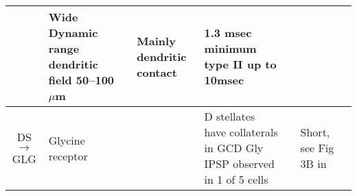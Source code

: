 \begin{longtable}{cXXXXXXX}
& %
Wide Dynamic range \citep{GhoshalKim:1997} 
dendritic field 50--100 $\mu$m \citep{FerragamoGoldingEtAl:1998a}                     
&                                            
& %
Mainly dendritic contact %
\citep{BensonBrown:2004}                
& %
1.3 msec minimum \citep{FerragamoGoldingEtAl:1998a} 
type II up to 10msec \citep[theoretical][]{Brown:1993}
\\ \midrule
DS\ensuremath{\rightarrow}GLG                                 
&                  
Glycine receptor                  
&  %
& 
& D stellates have collaterals in GCD \citep[mouse][]{OertelWuEtAl:1990}
Gly IPSP observed in 1 of 5 cells \citep{FerragamoGoldingEtAl:1998}    
&                                            
& %
Short, see Fig 3B in \citep{FerragamoGoldingEtAl:1998}\\ \midrule


\end{longtable}
